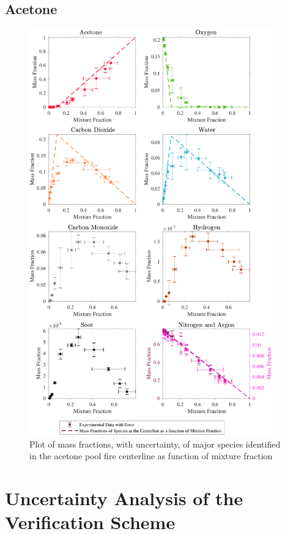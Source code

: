 \documentclass[12pt]{article}
\begin{document}
\subsection{Acetone}
\label{ssec:Acetone_ALL_Mix_Frac}
\begin{figure}[!h]
	\centering
\includegraphics[width=10.5cm,keepaspectratio]{Acetone_Mixture_Fraction_Major_Plot.pdf}
	\caption[Species mass fractions superimposed on acetone state relations]{Plot of mass fractions, with uncertainty, of major species identified in the acetone pool fire centerline as function of mixture fraction}
	\label{fig:Acetone_MIX_Frac_Major}
\end{figure}

\pagebreak

\section{Uncertainty Analysis of the Verification Scheme}\label{sec:Uncertainty_Ver_Scheme}
\end{document}
